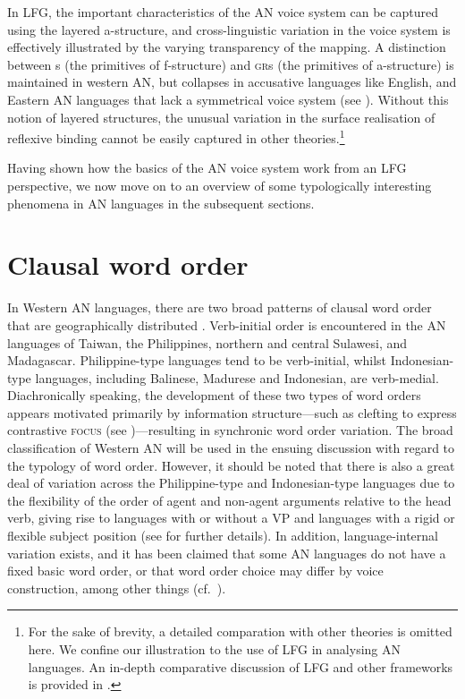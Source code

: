 \documentclass[output=paper,chinesefont]{../langscibook}
\begin{document}
\largerpage[-2]
In LFG, the important characteristics of the AN voice system can be captured using the layered a-structure, and cross-linguistic variation in the voice system is effectively illustrated by the varying transparency of the mapping. A distinction between {\GF}s (the primitives of f-structure) and \textsc{gr}s (the primitives of a-structure) is maintained in western AN, but collapses in accusative languages like English, and Eastern AN languages that lack a symmetrical voice system (see ). Without this notion of layered structures, the unusual variation in the surface realisation of reflexive binding cannot be easily captured in other theories.\footnote{For the sake of brevity, a detailed comparation with other theories is omitted here. We confine our illustration to the use of LFG in analysing AN languages. An in-depth comparative discussion of LFG and other frameworks is provided in .}

Having shown how the basics of the AN voice system work from an LFG perspective, we now move on to an overview of some typologically interesting phenomena in AN languages in the subsequent sections.

\section{Clausal word order}
\label{sec:Austronesian:3}

In Western AN languages, there are two broad patterns of clausal word order that are geographically distributed \citep[461--461]{Blust2013}. Verb-initial order is encountered in the AN languages of Taiwan, the Philippines, northern and central Sulawesi, and Madagascar. Philippine-type languages tend to be verb-initial, whilst Indonesian-type languages, including Balinese, Madurese and Indonesian, are verb-medial. Diachronically speaking, the development of these two types of word orders appears motivated primarily by information structure—such as clefting to express contrastive \textsc{focus} (see )—resulting in synchronic word order variation. The broad classification of Western AN will be used in the ensuing discussion with regard to the typology of word order. However, it should be noted that there is also a great deal of variation across the Philippine-type and Indonesian-type languages due to the flexibility of the order of agent and non-agent arguments relative to the head verb, giving rise to languages with or without a VP and languages with a rigid or flexible subject position (see \citealt{Riesberg2019} for further details). In addition, language-internal variation exists, and it has been claimed that some AN languages do not have a fixed basic word order, or that word order choice may differ by voice construction, among other things (cf.\ \citealt{Riesberg2019}).
\end{document}
